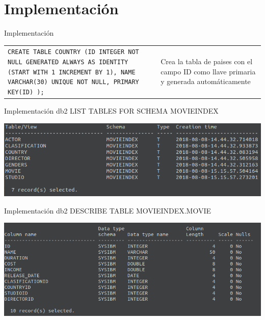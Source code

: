 \documentclass{beamer}%
\begin{document}
\section{Implementaci\'on}
\begin{frame}{Implementaci\'on}
\centering
\begin{tabular}{p{4cm}cp{4cm}}
\texttt{\textcolor{pur}{CREATE TABLE} COUNTRY (ID \textcolor{ver}{INTEGER} \textcolor{pur}{NOT NULL} GENERATED ALWAYS AS IDENTITY (START WITH 1 INCREMENT BY 1), NAME \textcolor{ver}{VARCHAR(30)} \textcolor{pur}{UNIQUE NOT NULL},
    PRIMARY KEY(ID)
);}

& \hspace{1cm} &
 Crea la tabla de paises con el campo ID como llave primaria y generada autom\'aticamente\\
\end{tabular}
\end{frame}

\begin{frame}{Implementaci\'on}
db2 LIST TABLES FOR SCHEMA MOVIEINDEX
\begin{center}
\includegraphics[scale=0.4]{figures/screenshot_output_list_tables.png}
\end{center}
\end{frame}

\begin{frame}{Implementaci\'on}
db2 DESCRIBE TABLE MOVIEINDEX.MOVIE
\begin{center}
\includegraphics[scale=0.4]{figures/screenshot_output_movie_description.png}
\end{center}
\end{frame}
\end{document}
